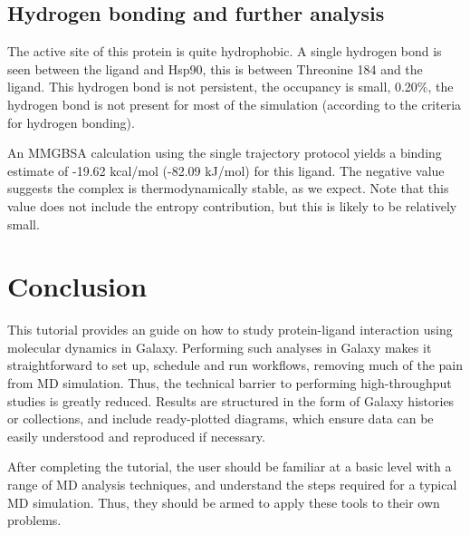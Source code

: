 \documentclass[twocolumn]{bmcart}%
\begin{document}
\subsection*{Hydrogen bonding and further analysis}
The active site of this protein is quite hydrophobic. A single hydrogen
bond is seen between the ligand and Hsp90, this is between Threonine 184
and the ligand. This hydrogen bond is not persistent, the occupancy is
small, 0.20\%, the hydrogen bond is not present for most of the simulation
(according to the criteria for hydrogen bonding).

An MMGBSA calculation using the single trajectory protocol yields a binding estimate of -19.62 kcal/mol (-82.09 kJ/mol) for this ligand. The negative value suggests the complex is thermodynamically stable, as we expect. Note that this value does not include the entropy contribution, but this is likely to be relatively small.

\hypertarget{conclusion}{%
\section*{Conclusion}\label{conclusion}}

This tutorial provides an guide on how to study protein-ligand interaction using molecular dynamics in Galaxy. Performing such analyses in Galaxy makes it straightforward to set up, schedule and run workflows, removing much of the pain from MD simulation. Thus, the technical barrier to performing high-throughput studies is greatly reduced. Results are structured in the form of Galaxy histories or collections, and include ready-plotted diagrams, which ensure data can be easily understood and reproduced if necessary.

After completing the tutorial, the user should be familiar at a basic level with a range of MD analysis techniques, and understand the steps required for a typical MD simulation. Thus, they should be armed to apply these tools to their own problems.



\end{document}
